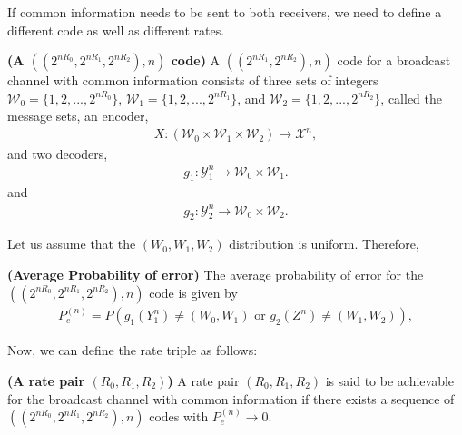 %
If common information needs to be sent to both receivers, we need to define a different code as well as different rates.
%
%
\begin{tcolorbox}[boxrule=0pt,frame hidden,sharp corners,enhanced, opacityback=0, borderline west={2pt}{0pt}{red}]
\begin{defn} \textbf{(A $((2^{nR_0}, 2^{nR_1},2^{nR_2}),n)$ code)} A $((2^{nR_1},2^{nR_2}),n)$ code for a broadcast channel with common information consists of three sets of integers $\mathcal{W}_0 = \{1,2,...,2^{nR_0} \}$, $\mathcal{W}_1 = \{1,2,...,2^{nR_1} \}$, and $\mathcal{W}_2 = \{1,2,...,2^{nR_2} \}$, called the message sets, an encoder,
%
\begin{eqnarray}
    X: (\mathcal{W}_0 \times \mathcal{W}_1 \times \mathcal{W}_2) \rightarrow \mathcal{X}^n,
\end{eqnarray}
%
and two decoders,
%
\begin{eqnarray}
    g_1: \mathcal{Y}_1^n \rightarrow \mathcal{W}_0 \times \mathcal{W}_1.
\end{eqnarray}
%
and
%
\begin{eqnarray}
    g_2: \mathcal{Y}_2^n \rightarrow \mathcal{W}_0 \times \mathcal{W}_2.
\end{eqnarray}
%
\end{defn}
\end{tcolorbox}
%
Let us assume that the $(W_0, W_1, W_2)$ distribution is uniform. Therefore,
%
\begin{tcolorbox}[boxrule=0pt,frame hidden,sharp corners,enhanced, opacityback=0, borderline west={2pt}{0pt}{red}]
\begin{defn} \textbf{(Average Probability of error)} The average probability of error for the $((2^{nR_0}, 2^{nR_1},2^{nR_2}),n)$ code is given by
%
\begin{eqnarray}
    P_e^{(n)} = P(g_1(Y^n_1) \neq (W_0, W_1) \text{ or } g_2(Z^n) \neq (W_1, W_2)),
\end{eqnarray}
%
\end{defn}
\end{tcolorbox}
%
Now, we can define the rate triple as follows:
%
\begin{tcolorbox}[boxrule=0pt,frame hidden,sharp corners,enhanced, opacityback=0, borderline west={2pt}{0pt}{red}]
\begin{defn} \textbf{(A rate pair $(R_0, R_1, R_2)$)} A rate pair $(R_0, R_1, R_2)$ is said to be achievable for the broadcast channel with common information if there exists a sequence of $((2^{nR_0}, 2^{nR_1},2^{nR_2}),n)$ codes with $P_e^{(n)}\rightarrow 0$.
\end{defn}
\end{tcolorbox}
